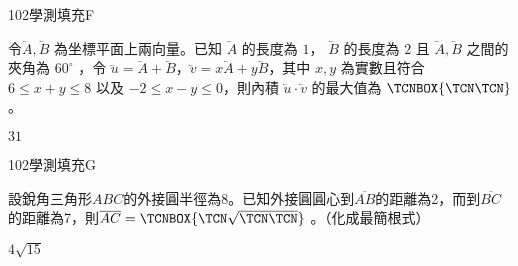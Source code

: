     \begin{QUESTION}
        \begin{ExamInfo}{102}{學測}{填充}{F}
        \end{ExamInfo}
        \begin{ExamAnsRateInfo}{11}{29}{3}{1}
        \end{ExamAnsRateInfo}
        \begin{QBODY}
            令$\lvec{A}, \lvec{B}$  為坐標平面上兩向量。已知 $\lvec{A}$ 的長度為 $1$， $\lvec{B}$ 的長度為 $2$ 且 $\lvec{A}, \lvec{B}$ 之間的夾角為 $60 ^\circ$ ，令 $\lvec{u} = \lvec{A} + \lvec{B}$，$\lvec{v} = x\lvec{A} + y \lvec{B} $，其中 $x,y$ 為實數且符合 $6 \le x+y  \le 8 $ 以及 $-2 \le x-y \le 0$，則內積 $\lvec{u} \cdot \lvec{v}$ 的最大值為 $\TCNBOX{ \TCN\TCN }$ 。
        \end{QBODY}
        \begin{QFROMS}
        \end{QFROMS}
        \begin{QTAGS}\end{QTAGS}
        \begin{QANS}
            $31$
        \end{QANS}
        \begin{QSOLLIST}
        \end{QSOLLIST}
        \begin{QEMPTYSPACE}
        \end{QEMPTYSPACE}
    \end{QUESTION}
    \begin{QUESTION}
        \begin{ExamInfo}{102}{學測}{填充}{G}
        \end{ExamInfo}
        \begin{ExamAnsRateInfo}{19}{46}{10}{1}
        \end{ExamAnsRateInfo}
        \begin{QBODY}
            設銳角三角形$ABC$的外接圓半徑為8。已知外接圓圓心到$\overline{AB}$的距離為2，而到$\overline{BC}$的距離為7，則$\overline{AC}=\TCNBOX{\TCN\sqrt{\TCN\TCN}}$ 。（化成最簡根式）
        \end{QBODY}
        \begin{QFROMS}
        \end{QFROMS}
        \begin{QTAGS}\end{QTAGS}
        \begin{QANS}
            $4\sqrt{15}$
        \end{QANS}
        \begin{QSOLLIST}
        \end{QSOLLIST}
        \begin{QEMPTYSPACE}
        \end{QEMPTYSPACE}
    \end{QUESTION}

